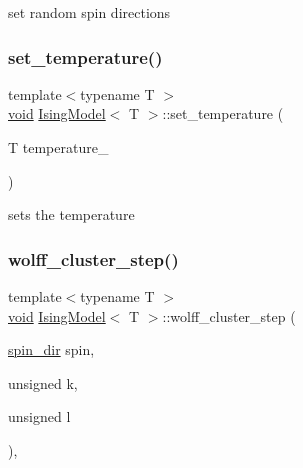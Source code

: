 set random spin directions 

\mbox{\label{classIsingModel_abbd5b7935830eca268b7eacc94478649}} 
\subsubsection{\texorpdfstring{set\+\_\+temperature()}{set\_temperature()}}
{\footnotesize\ttfamily template$<$typename T $>$ \\
\mbox{\hyperlink{glad_8h_a950fc91edb4504f62f1c577bf4727c29}{void}} \mbox{\hyperlink{classIsingModel}{Ising\+Model}}$<$ T $>$\+::set\+\_\+temperature (\begin{DoxyParamCaption}\item[{T}]{temperature\+\_\+ }\end{DoxyParamCaption})\hspace{0.3cm}{\ttfamily [inline]}}



sets the temperature 

\mbox{\label{classIsingModel_a37758a1a4a2536d16f1bb8166e13f7b6}} 
\subsubsection{\texorpdfstring{wolff\+\_\+cluster\+\_\+step()}{wolff\_cluster\_step()}}
{\footnotesize\ttfamily template$<$typename T $>$ \\
\mbox{\hyperlink{glad_8h_a950fc91edb4504f62f1c577bf4727c29}{void}} \mbox{\hyperlink{classIsingModel}{Ising\+Model}}$<$ T $>$\+::wolff\+\_\+cluster\+\_\+step (\begin{DoxyParamCaption}\item[{\mbox{\hyperlink{classspin__dir}{spin\+\_\+dir}}}]{spin,  }\item[{unsigned}]{k,  }\item[{unsigned}]{l }\end{DoxyParamCaption})\hspace{0.3cm}{\ttfamily [inline]}, {\ttfamily [private]}}



